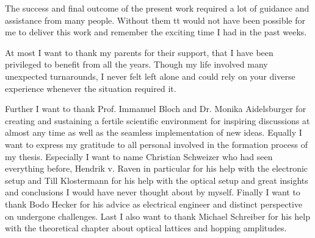 
The success and final outcome of the present work required a lot of guidance
and assistance from many people. Without them tt would not have been possible
for me to deliver this work and remember the exciting time I had in the past
weeks.

At most I want to thank my parents for their support, that I have been
privileged to benefit from all the years. Though my life involved many
unexpected turnarounds, I never felt left alone and could rely on your
diverse experience whenever the situation required it.

Further I want to thank Prof. Immanuel Bloch and Dr. Monika Aidelsburger for
creating and sustaining a fertile scientific environment for inspiring
discussions at almost any time as well as the seamless implementation of new
ideas.
Equally I want to express my gratitude to all personal involved in the
formation process of my thesis. Especially I want to name Christian Schweizer
who had seen everything before, Hendrik v. Raven in particular for his help
with the electronic setup and Till Klostermann for his help with the optical
setup and great insights and conclusions I would have never thought about by
myself. Finally I want to thank Bodo Hecker for his advice as electrical
engineer and distinct perspective on undergone challenges. Last I also want to
thank Michael Schreiber for his help with the theoretical chapter about
optical lattices and hopping amplitudes.
